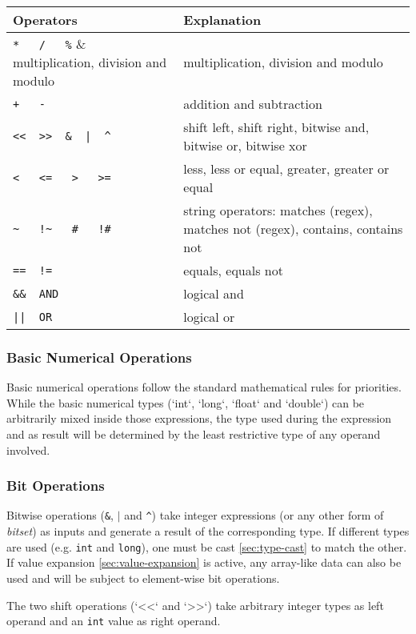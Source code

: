 \documentclass[11pt]{article}
\begin{document}
\begin{tabular}{|p{}|p{}|}
	\hline 
Operators	& Explanation \\ 
	\hline 
	\hline
\verb|*   /   %|	& multiplication, division and modulo \\ 
	\hline 
\verb|+   -|	& addition and subtraction \\ 
	\hline 
\verb#<<  >>  &  |  ^#	& shift left, shift right, bitwise and, bitwise or, bitwise xor \\ 
	\hline 
\verb|<   <=   >   >=|	& less, less or equal, greater, greater or equal \\ 
	\hline 
\verb|~   !~   #   !#|	& string operators: matches (regex), matches not (regex), contains, contains not \\ 
	\hline 
\verb|==  !=|	& equals, equals not \\ 
	\hline 
\verb|&&  AND|	& logical and \\ 
	\hline 
\verb#||  OR#	& logical or \\ 
	\hline 
\end{tabular} 

\subsubsection{Basic Numerical Operations}
\label{sec:basic-numerical-operations}

Basic numerical operations follow the standard mathematical rules for priorities.
While the basic numerical types (`int`, `long`, `float` and `double`) can be arbitrarily mixed inside those expressions, the type used during the expression and as result will be determined by the least restrictive type of any operand involved.

\subsubsection{Bit Operations}
\label{sec:bit-operations}

Bitwise operations (\texttt{\&}, \texttt{$|$} and \texttt{\textasciicircum}) take integer expressions (or any other form of \textit{bitset}) as inputs and generate a result of the corresponding type. If different types are used (e.g. \texttt{int} and \texttt{long}), one must be cast \cref{sec:type-cast} to match the other. If value expansion \cref{sec:value-expansion} is active, any array-like data can also be used and will be subject to element-wise bit operations.

The two shift operations (`<<` and `>>`) take arbitrary integer types as left operand and an \texttt{int} value as right operand.
\end{document}

